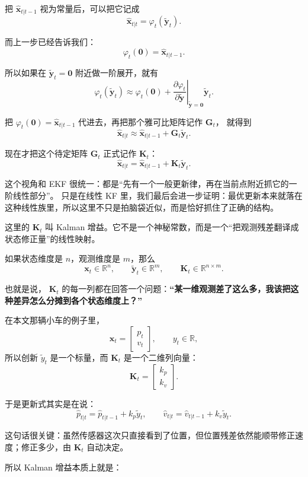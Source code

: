 \documentclass[12pt,a4paper]{ctexart}
\begin{document}
把
\(\hat{\bm{x}}_{t|t-1}\)
视为常量后，可以把它记成
\[
\hat{\bm{x}}_{t|t} = \varphi_t(\tilde{\bm{y}}_t).
\]

而上一步已经告诉我们：
\[
\varphi_t(\bm{0}) = \hat{\bm{x}}_{t|t-1}.
\]

所以如果在
\(\tilde{\bm{y}}_t=\bm{0}\)
附近做一阶展开，就有
\[
\varphi_t(\tilde{\bm{y}}_t)
\approx
\varphi_t(\bm{0})
+
\left.\frac{\partial \varphi_t}{\partial \tilde{\bm{y}}}\right|_{\tilde{\bm{y}}=\bm{0}}
\tilde{\bm{y}}_t.
\]

把
\(\varphi_t(\bm{0}) = \hat{\bm{x}}_{t|t-1}\)
代进去，再把那个雅可比矩阵记作
\(\bm{G}_t\)，
就得到
\[
\hat{\bm{x}}_{t|t}
\approx
\hat{\bm{x}}_{t|t-1} + \bm{G}_t\tilde{\bm{y}}_t.
\]

现在才把这个待定矩阵
\(\bm{G}_t\)
正式记作
\(\bm{K}_t\)：
\[
\hat{\bm{x}}_{t|t}
= \hat{\bm{x}}_{t|t-1} + \bm{K}_t\tilde{\bm{y}}_t.
\]

这个视角和 EKF 很统一：都是“先有一个一般更新律，再在当前点附近抓它的一阶线性部分”。
只是在线性 KF 里，我们最后会进一步证明：最优更新本来就落在这种线性族里，所以这里不只是拍脑袋近似，而是恰好抓住了正确的结构。

这里的
\(\bm{K}_t\)
叫 Kalman 增益。它不是一个神秘常数，而是一个“把观测残差翻译成状态修正量”的线性映射。

如果状态维度是 \(n\)，观测维度是 \(m\)，那么
\[
\bm{x}_t \in \mathbb{R}^n,\qquad
\tilde{\bm{y}}_t \in \mathbb{R}^m,\qquad
\bm{K}_t \in \mathbb{R}^{n\times m}.
\]

也就是说，
\(\bm{K}_t\)
的每一列都在回答一个问题：\textbf{“某一维观测差了这么多，我该把这种差异怎么分摊到各个状态维度上？”}

在本文那辆小车的例子里，
\[
\bm{x}_t =
\begin{bmatrix}
p_t\\
v_t
\end{bmatrix},
\qquad
y_t \in \mathbb{R},
\]
所以创新
\(\tilde{y}_t\)
是一个标量，而
\(\bm{K}_t\)
是一个二维列向量：
\[
\bm{K}_t =
\begin{bmatrix}
k_p\\
k_v
\end{bmatrix}.
\]

于是更新式其实是在说：
\[
\hat{p}_{t|t} = \hat{p}_{t|t-1} + k_p \tilde{y}_t,
\qquad
\hat{v}_{t|t} = \hat{v}_{t|t-1} + k_v \tilde{y}_t.
\]

这句话很关键：虽然传感器这次只直接看到了位置，但位置残差依然能顺带修正速度；修正多少，由
\(\bm{K}_t\)
自动决定。

所以 Kalman 增益本质上就是：
\end{document}
